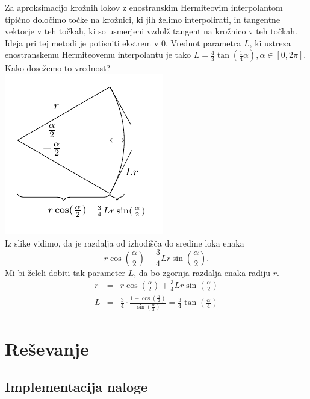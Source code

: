 \documentclass[a4paper,12pt]{article}
\begin{document}
	Za aproksimacijo krožnih lokov z enostranskim Hermiteovim interpolantom tipično določimo točke na krožnici, ki jih želimo interpolirati, 
	in tangentne vektorje v teh točkah, ki so usmerjeni vzdolž tangent na krožnico v teh točkah. Ideja pri tej metodi je potisniti ekstrem v $0$. 
	Vrednot parametra $L$, ki ustreza enostranskemu Hermiteovemu interpolantu je tako $L = \frac{4}{3} \tan(\frac{1}{4}\alpha), \alpha \in [0,2\pi]$.
	Kako dosežemo to vrednost? \\
	\noindent\hspace*{10em}
	\includegraphics[scale=1.5]{slika.pdf} 
	\\
	Iz slike vidimo, da je razdalja od izhodišča do sredine loka enaka 
	$$r\cos(\frac{\alpha}{2}) + \frac{3}{4}Lr\sin(\frac{\alpha}{2}).$$
	Mi bi želeli dobiti tak parameter $L$, da bo zgornja razdalja enaka radiju $r$.
	\begin{eqnarray*}
		r &=& r\cos(\frac{\alpha}{2}) + \frac{3}{4}Lr\sin(\frac{\alpha}{2})\\
		L &=& \frac{3}{4} \cdot \frac{1-\cos(\frac{\alpha}{2})}{\sin(\frac{\alpha}{2})} = \frac{3}{4}\tan(\frac{\alpha}{4})
	\end{eqnarray*}
	
	\section{Reševanje}
	\subsection{Implementacija naloge}
	
\end{document}
